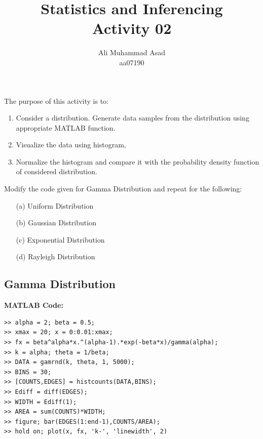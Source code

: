\documentclass{article}
\title{Statistics and Inferencing\\ Activity 02}
\author{Ali Muhammad Asad\\ aa07190}
\date{} %
\theoremstyle{mytheoremstyle}
\theoremstyle{mytheoremstyle}
\theoremstyle{myproblemstyle}
\begin{document}
\maketitle

The purpose of this activity is to:
\begin{enumerate}
    \item Consider a distribution. Generate data samples from the distribution using appropriate MATLAB function.
    \item Visualize the data using histogram,
    \item Normalize the histogram and compare it with the probability density function of considered distribution.
\end{enumerate}

Modify the code given for Gamma Distribution and repeat for the following:
\begin{enumerate}
    \item[(a)] Uniform Distribution
    \item[(b)] Gaussian Distribution
    \item[(c)] Exponential Distribution
    \item[(d)] Rayleigh Distribution   
\end{enumerate}

\newpage
\subsection*{Gamma Distribution}

\textbf{MATLAB Code:}
\begin{lstlisting}[caption={Gamma Distribution},label={Gamma}]
>> alpha = 2; beta = 0.5;
>> xmax = 20; x = 0:0.01:xmax;
>> fx = beta^alpha*x.^(alpha-1).*exp(-beta*x)/gamma(alpha);
>> k = alpha; theta = 1/beta;
>> DATA = gamrnd(k, theta, 1, 5000);
>> BINS = 30;
>> [COUNTS,EDGES] = histcounts(DATA,BINS);
>> Ediff = diff(EDGES);
>> WIDTH = Ediff(1);
>> AREA = sum(COUNTS)*WIDTH;
>> figure; bar(EDGES(1:end-1),COUNTS/AREA);
>> hold on; plot(x, fx, 'k-', 'linewidth', 2)
\end{lstlisting}
\end{document}
